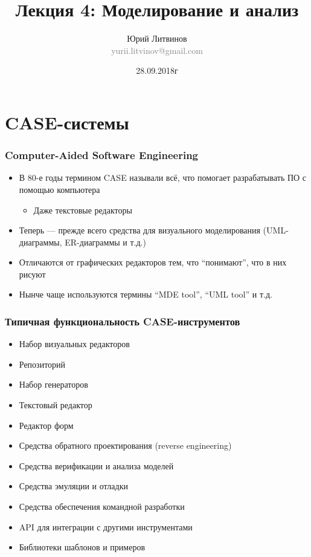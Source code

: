 \documentclass[xetex,mathserif,serif]{beamer}
\title[Моделирование и анализ]{Лекция 4: Моделирование и анализ}
\author[Юрий Литвинов]{Юрий Литвинов\\\small{\textcolor{gray}{yurii.litvinov@gmail.com}}}
\date{28.09.2018г}
\begin{document}
	\frame{\titlepage}

	\section{CASE-системы}
	
	\begin{frame}
		\frametitle{Computer-Aided Software Engineering}
		\begin{itemize}
			\item В 80-е годы термином CASE называли всё, что помогает разрабатывать ПО с помощью компьютера
			\begin{itemize}
				\item Даже текстовые редакторы
			\end{itemize}
			\item Теперь --- прежде всего средства для визуального моделирования (UML-диаграммы, ER-диаграммы и т.д.)
			\item Отличаются от графических редакторов тем, что ``понимают'', что в них рисуют
			\item Нынче чаще используются термины ``MDE tool'', ``UML tool'' и т.д.
		\end{itemize}
	\end{frame}

	\begin{frame}
		\frametitle{Типичная функциональность CASE-инструментов}
		\begin{itemize}
			\item Набор визуальных редакторов
			\item Репозиторий
			\item Набор генераторов
			\item Текстовый редактор
			\item Редактор форм
			\item Средства обратного проектирования (reverse engineering)
			\item Средства верификации и анализа моделей
			\item Средства эмуляции и отладки
			\item Средства обеспечения командной разработки
			\item API для интеграции с другими инструментами
			\item Библиотеки шаблонов и примеров
		\end{itemize}
	\end{frame}
\end{document}
